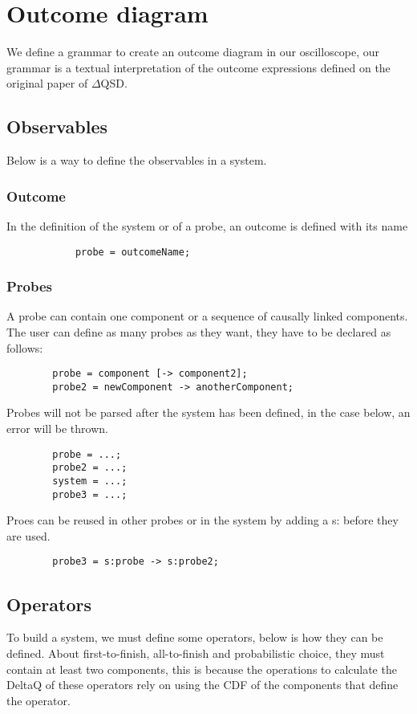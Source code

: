   \section{Outcome diagram}
        We define a grammar to create an outcome diagram in our oscilloscope, our grammar is a textual interpretation of the outcome expressions defined on the original paper of $\Delta$QSD. \\
        \subsection{Observables}
            Below is a way to define the observables in a system.
            \subsubsection{Outcome}
                In the definition of the system or of a probe, an outcome is defined with its name
        \begin{verbatim}
            probe = outcomeName;
        \end{verbatim}
            \subsubsection{Probes}
                
        A probe can contain one component or a sequence of causally linked components. \\
        The user can define as many probes as they want, they have to be declared as follows:
   \begin{verbatim}
        probe = component [-> component2];
        probe2 = newComponent -> anotherComponent;
   \end{verbatim}

    Probes will not be parsed after the system has been defined, in the case below, an error will be thrown.
    \begin{verbatim}
        probe = ...;
        probe2 = ...;
        system = ...;
        probe3 = ...;
    \end{verbatim}
    
    Proes can be reused in other probes or in the system by adding a s: before they are used.
    \begin{verbatim}
        probe3 = s:probe -> s:probe2;
    \end{verbatim}
 
        \subsection{Operators}
        To build a system, we must define some operators, below is how they can be defined. About first-to-finish, all-to-finish and probabilistic choice, they must contain at least two components, this is because the operations to calculate the DeltaQ of these operators rely on using the CDF of the components that define the operator.

